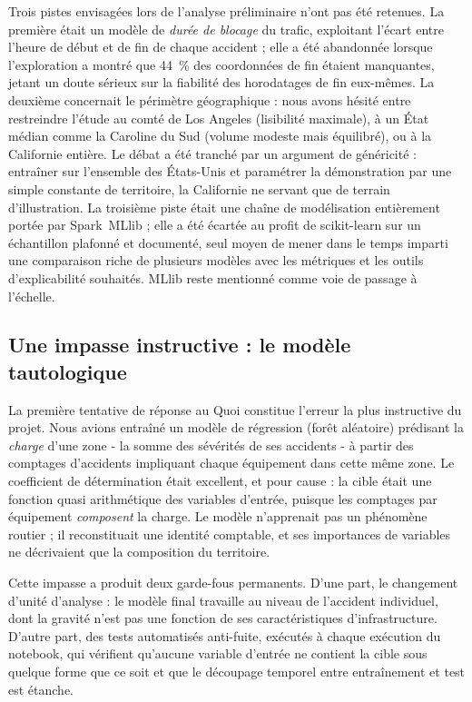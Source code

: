 \documentclass[12pt, a4paper]{article}
\begin{document}
Trois pistes envisagées lors de l'analyse préliminaire n'ont pas été retenues. La première était un modèle de \emph{durée de blocage} du trafic, exploitant l'écart entre l'heure de début et de fin de chaque accident ; elle a été abandonnée lorsque l'exploration a montré que 44~\% des coordonnées de fin étaient manquantes, jetant un doute sérieux sur la fiabilité des horodatages de fin eux-mêmes. La deuxième concernait le périmètre géographique : nous avons hésité entre restreindre l'étude au comté de Los Angeles (lisibilité maximale), à un État médian comme la Caroline du Sud (volume modeste mais équilibré), ou à la Californie entière. Le débat a été tranché par un argument de généricité : entraîner sur l'ensemble des États-Unis et paramétrer la démonstration par une simple constante de territoire, la Californie ne servant que de terrain d'illustration. La troisième piste était une chaîne de modélisation entièrement portée par Spark~MLlib ; elle a été écartée au profit de scikit-learn sur un échantillon plafonné et documenté, seul moyen de mener dans le temps imparti une comparaison riche de plusieurs modèles avec les métriques et les outils d'explicabilité souhaités. MLlib reste mentionné comme voie de passage à l'échelle.

\subsection{Une impasse instructive : le modèle tautologique}

La première tentative de réponse au \og Quoi \fg{} constitue l'erreur la plus instructive du projet. Nous avions entraîné un modèle de régression (forêt aléatoire) prédisant la \emph{charge} d'une zone - la somme des sévérités de ses accidents - à partir des comptages d'accidents impliquant chaque équipement dans cette même zone. Le coefficient de détermination était excellent, et pour cause : la cible était une fonction quasi arithmétique des variables d'entrée, puisque les comptages par équipement \emph{composent} la charge. Le modèle n'apprenait pas un phénomène routier ; il reconstituait une identité comptable, et ses importances de variables ne décrivaient que la composition du territoire.

Cette impasse a produit deux garde-fous permanents. D'une part, le changement d'unité d'analyse : le modèle final travaille au niveau de l'accident individuel, dont la gravité n'est pas une fonction de ses caractéristiques d'infrastructure. D'autre part, des tests automatisés anti-fuite, exécutés à chaque exécution du notebook, qui vérifient qu'aucune variable d'entrée ne contient la cible sous quelque forme que ce soit et que le découpage temporel entre entraînement et test est étanche.
\end{document}
